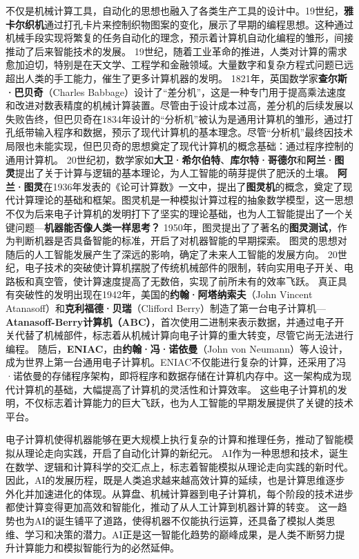 不仅是机械计算工具，自动化的思想也融入了各类生产工具的设计中。19世纪，{\bf 雅卡尔织机}通过打孔卡片来控制织物图案的变化，展示了早期的编程思想。这种通过机械手段实现将繁复的任务自动化的理念，预示着计算机自动化编程的雏形，间接推动了后来智能技术的发展。
19世纪，随着工业革命的推进，人类对计算的需求愈加迫切，特别是在天文学、工程学和金融领域。大量数字和复杂方程式问题已远超出人类的手工能力，催生了更多计算机器的发明。
1821年，英国数学家{\bf 查尔斯·巴贝奇}（Charles Babbage）设计了“差分机”，这是一种专门用于提高乘法速度和改进对数表精度的机械计算装置。尽管由于设计成本过高，差分机的后续发展以失败告终，但巴贝奇在1834年设计的“分析机”被认为是通用计算机的雏形，通过打孔纸带输入程序和数据，预示了现代计算机的基本理念。尽管“分析机”最终因技术局限也未能实现，但巴贝奇的思想奠定了现代计算机的概念基础：通过程序控制的通用计算机。
20世纪初，数学家如{\bf 大卫·希尔伯特}、{\bf 库尔特·哥德尔}和{\bf 阿兰·图灵}提出了关于计算与逻辑的基本理论，为人工智能的萌芽提供了肥沃的土壤。
{\bf 阿兰·图灵}在1936年发表的《论可计算数》一文中，提出了{\bf 图灵机}的概念，奠定了现代计算理论的基础和框架。图灵机是一种模拟计算过程的抽象数学模型，这一思想不仅为后来电子计算机的发明打下了坚实的理论基础，也为人工智能提出了一个关键问题---{\bf 机器能否像人类一样思考？} 1950年，图灵提出了了著名的{\bf 图灵测试}，作为判断机器是否具备智能的标准，开启了对机器智能的早期探索。
图灵的思想对随后的人工智能发展产生了深远的影响，确定了未来人工智能的发展方向。
20世纪，电子技术的突破使计算机摆脱了传统机械部件的限制，转向实用电子开关、电路板和真空管，使计算速度提高了无数倍，实现了前所未有的效率飞跃。
真正具有突破性的发明出现在1942年，美国的{\bf 约翰·阿塔纳索夫}（John Vincent Atanasoff）和{\bf 克利福德·贝瑞}（Clifford Berry）制造了第一台电子计算机---{\bf Atanasoff-Berry计算机（ABC）}，首次使用二进制来表示数据，并通过电子开关代替了机械部件，标志着从机械计算向电子计算的重大转变，尽管它尚无法进行编程。
随后，{\bf ENIAC}，由{\bf 约翰·冯·诺依曼}（John von Neumann）等人设计，成为世界上第一台通用电子计算机。ENIAC不仅能进行复杂的计算，还采用了冯·诺依曼的存储程序架构，即将程序和数据存储在计算机内存中。这一架构成为现代计算机的基础，大幅提高了计算机的灵活性和计算效率。
这些电子计算机的发明，不仅标志着计算能力的巨大飞跃，也为人工智能的早期发展提供了关键的技术平台。

电子计算机使得机器能够在更大规模上执行复杂的计算和推理任务，推动了智能模拟从理论走向实践，开启了自动化计算的新纪元。
AI作为一种思想和技术，诞生在数学、逻辑和计算科学的交汇点上，标志着智能模拟从理论走向实践的新时代。
因此，AI的发展历程，既是人类追求越来越高效计算的延续，也是计算思维逐步外化并加速进化的体现。从算盘、机械计算器到电子计算机，每个阶段的技术进步都使计算变得更加高效和智能化，推动了从人工计算到机器计算的转变。
这一趋势也为AI的诞生铺平了道路，使得机器不仅能执行运算，还具备了模拟人类思维、学习和决策的潜力。AI正是这一智能化趋势的巅峰成果，是人类不断努力提升计算能力和模拟智能行为的必然延伸。
